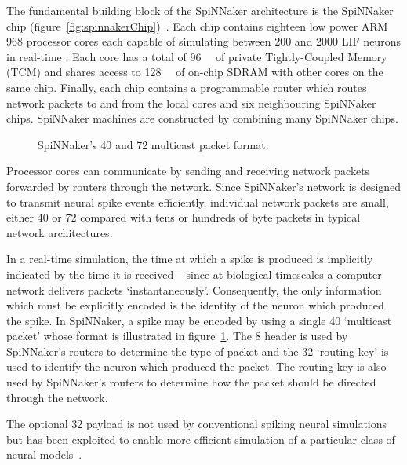 		The fundamental building block of the SpiNNaker architecture is the
		SpiNNaker chip (figure~\ref{fig:spinnakerChip})~\cite{furber13}. Each chip
		contains eighteen low power ARM 968 processor cores each capable of
		simulating between \num{200} and \num{2000} LIF neurons in real-time
		\cite{mundy15}.  Each core has a total of \SI{96}{\kilo\byte} of private
		Tightly-Coupled Memory (TCM) and shares access to \SI{128}{\mega\byte} of
		on-chip SDRAM with other cores on the same chip. Finally, each chip
		contains a programmable router which routes network packets to and from the
		local cores and six neighbouring SpiNNaker chips. SpiNNaker machines are
		constructed by combining many SpiNNaker chips.
		
		\begin{figure}
			\center
			
			\caption{SpiNNaker's \SI{40}{\bit} and \SI{72}{\bit} multicast packet
			format.}
			\label{fig:spinnaker-packet}
		\end{figure}
		
		Processor cores can communicate by sending and receiving network packets
		forwarded by routers through the network. Since SpiNNaker's network is
		designed to transmit neural spike events efficiently, individual network
		packets are small, either \SI{40}{\bit} or \SI{72}{\bit} compared with tens
		or hundreds of byte packets in typical network architectures.
		
		In a real-time simulation, the time at which a spike is produced is
		implicitly indicated by the time it is received -- since at biological
		timescales a computer network delivers packets `instantaneously'.
		Consequently, the only information which must be explicitly encoded is the
		identity of the neuron which produced the spike. In SpiNNaker, a spike may
		be encoded by using a single \SI{40}{\bit} `multicast packet' whose format
		is illustrated in figure~\ref{fig:spinnaker-packet}.  The \SI{8}{\bit}
		header is used by SpiNNaker's routers to determine the type of packet and
		the \SI{32}{\bit} `routing key' is used to identify the neuron which
		produced the packet. The routing key is also used by SpiNNaker's routers to
		determine how the packet should be directed through the network.
		
		The optional \SI{32}{\bit} payload is not used by conventional spiking
		neural simulations~\cite{galluppi10} but has been exploited to enable more
		efficient simulation of a particular class of neural models~\cite{mundy15}.
	
